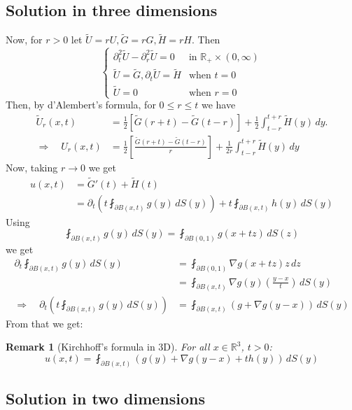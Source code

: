 \documentclass{report}
\theoremstyle{tommy}
\newtheorem{rem}[defn]{Remark}
\begin{document}
  \subsection{Solution in three dimensions}
  Now, for \(r > 0\) let \(\tilde U = r U, \tilde G = rG, \tilde H = rH\). Then 
  \[\begin{cases}
    \partial_t^2 \tilde U - \partial_r^2 \tilde U = 0 & \text{in } \mathbb{R}_+ \times (0,\infty) \\
    \tilde U = \tilde G, \partial_t \tilde U = \tilde H &\text{when } t = 0 \\
    \tilde U = 0 &\text{when } r = 0
  \end{cases}\]
  Then, by d'Alembert's formula, for \(0 \le r \le t\) we have
  \begin{align*}
    \tilde U_r(x,t) &= \frac{1}{2} \left[\tilde G(r+t) - \tilde G(t-r)\right] + \frac{1}{2} \int_{t-r}^{t+r} \tilde H(y) \, dy. \\
    \Rightarrow \quad U_r(x,t) &= \frac{1}{2} \left[\frac{\tilde G(r+t) - \tilde G(t-r)}{r}\right]  + \frac{1}{2r} \int_{t-r}^{t+r} \tilde H(y) \, dy 
  \end{align*}
  Now, taking \(r \to 0\) we get 
  \begin{align*}
    u(x,t) &= \tilde G'(t) + \tilde H(t) \\
    &= \partial_t \left(t \fint_{\partial B(x,t)} g(y) \, dS(y) \right) + t \fint_{\partial B(x,t)} h(y) \, dS(y)
  \end{align*}
  Using 
  \[\fint_{\partial B(x,t)} g(y) \, dS(y) = \fint_{\partial B(0,1)} g(x+tz) \, dS(z)\]
  we get 
  \begin{align*}
    \partial_t \fint_{\partial B(x,t)} g(y) \, dS(y) &= \fint_{\partial B(0,1)} \nabla g(x+tz) z \, dz \\
    &= \fint_{\partial B(x,t)} \nabla g(y) \left(\frac{y-x}{t}\right) \, dS(y) \\
    \Rightarrow \quad \partial_t \left(t \fint_{\partial B(x,t)} g(y) \, dS(y)\right) &= \fint_{\partial B(x,t)} \left(g + \nabla g (y-x)\right) \, dS(y)
  \end{align*}
  From that we get:

  \begin{rem}[Kirchhoff's formula in 3D]
    For all \(x \in \mathbb{R}^3\), \(t > 0\):
    \[u(x,t) = \fint_{\partial B(x,t)} \left(g(y) + \nabla g (y-x) + th(y)\right)\, dS(y)\]
  \end{rem}

  \subsection{Solution in two dimensions}
  
\end{document}

